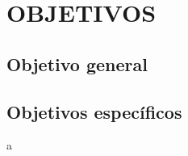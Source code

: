 \newpage
{}
\section{OBJETIVOS}

\subsection{Objetivo general}



\subsection{Objetivos específicos}
a